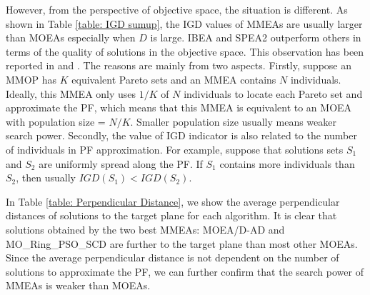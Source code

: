 \documentclass[conference]{IEEEtran}
\begin{document}
 However, from the perspective of objective space, the situation is different. As shown in Table \ref{table: IGD sumup}, the IGD values of MMEAs are usually larger than MOEAs especially when $D$ is large. IBEA and SPEA2 outperform others in terms of the quality of solutions in the objective space. This observation has been reported in \cite{liang2016multimodal} and \cite{shir2009enhancing}. The reasons are mainly from two aspects. Firstly, suppose an MMOP has $K$ equivalent Pareto sets and an MMEA contains $N$ individuals. Ideally, this MMEA only uses $1/K$ of $N$ individuals to locate each Pareto set and approximate the PF, which means that this MMEA is equivalent to an MOEA with population size = $N/K$. Smaller population size usually means weaker search power. Secondly, the value of IGD indicator is also related to the number of individuals in PF approximation. For example, suppose that solutions sets $S_1$ and $S_2$ are uniformly spread along the PF. If $S_1$ contains more individuals than $S_2$, then usually $IGD(S_1) < IGD(S_2)$. 
 
 In Table \ref{table: Perpendicular Distance}, we show the average perpendicular distances of solutions to the target plane for each algorithm. It is clear that solutions obtained by the two best MMEAs: MOEA/D-AD and MO\_Ring\_PSO\_SCD are further to the target plane than most other MOEAs. Since the average perpendicular distance is not dependent on the number of solutions to approximate the PF, we can further confirm that the search power of MMEAs is weaker than MOEAs.
\end{document}
